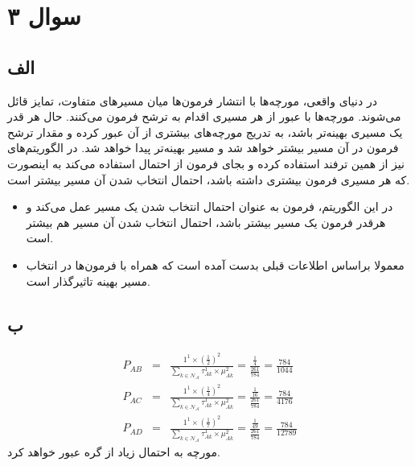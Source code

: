 \documentclass[12pt]{article}
\begin{document}
	 \section{سوال ۳}
	 \subsection{الف}
	 در دنیای واقعی، مورچه‌ها با انتشار فرمون‌ها  میان مسیرهای متفاوت، تمایز قائل می‌شوند. مورچه‌ها با عبور از هر مسیری‌ اقدام به ترشح فرمون می‌کنند. حال هر قدر یک مسیری بهینه‌تر باشد، به تدریج مورچه‌های بیشتری از آن عبور کرده و مقدار ترشح فرمون در آن مسیر بیشتر خواهد شد و مسیر بهینه‌تر پیدا خواهد شد. در الگوریتم‌های   نیز از همین ترفند استفاده کرده و بجای فرمون از احتمال استفاده می‌کند به اینصورت که هر مسیری فرمون بیشتری داشته باشد، احتمال انتخاب شدن آن مسیر بیشتر است.
	 \begin{itemize}
	 	\item {} در این الگوریتم، فرمون به عنوان احتمال انتخاب شدن یک مسیر عمل می‌کند و هرقدر فرمون یک مسیر بیشتر باشد، احتمال انتخاب شدن آن مسیر هم بیشتر است.
	 	\item {} معمولا براساس اطلاعات قبلی بدست آمده است که همراه با فرمون‌ها در انتخاب مسیر بهینه تاثیرگذار است. 
	 \end{itemize}
	 \subsection{ب}
	 \begin{eqnarray*}
	 	P_{AB} &=& \frac{1^{1}\times (\frac{1}{2})^{2}}{\sum_{k \in \mathcal{N_{A}}} \tau_{Ak}^{1} \times \mu_{Ak}^{2}}
	 	= \frac{\frac{1}{4}}{\frac{261}{784}}=\frac{784}{1044}\\
	 	P_{AC} &=& \frac{1^{1}\times (\frac{1}{4})^{2}}{\sum_{k \in \mathcal{N_{A}}} \tau_{Ak}^{1} \times \mu_{Ak}^{2}}
	 	= \frac{\frac{1}{16}}{\frac{261}{784}}=\frac{784}{4176}\\
	 	P_{AD} &=& \frac{1^{1}\times (\frac{1}{7})^{2}}{\sum_{k \in \mathcal{N_{A}}} \tau_{Ak}^{1} \times \mu_{Ak}^{2}}
	 	= \frac{\frac{1}{49}}{\frac{261}{784}}=\frac{784}{12789}
	 \end{eqnarray*}
	 مورچه به احتمال زیاد از گره  عبور خواهد کرد.
\end{document}
